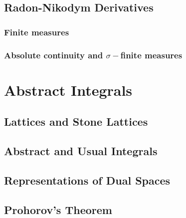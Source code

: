 \documentclass{report}
\begin{document}
\section{Radon-Nikodym Derivatives}

\subsection{Finite measures}


\subsection{Absolute continuity and $\sigma-$finite measures}


\chapter{Abstract Integrals}
\section{Lattices and Stone Lattices}

\section{Abstract and Usual Integrals}

\section{Representations of Dual Spaces}

\section{Prohorov's Theorem}
\end{document}
